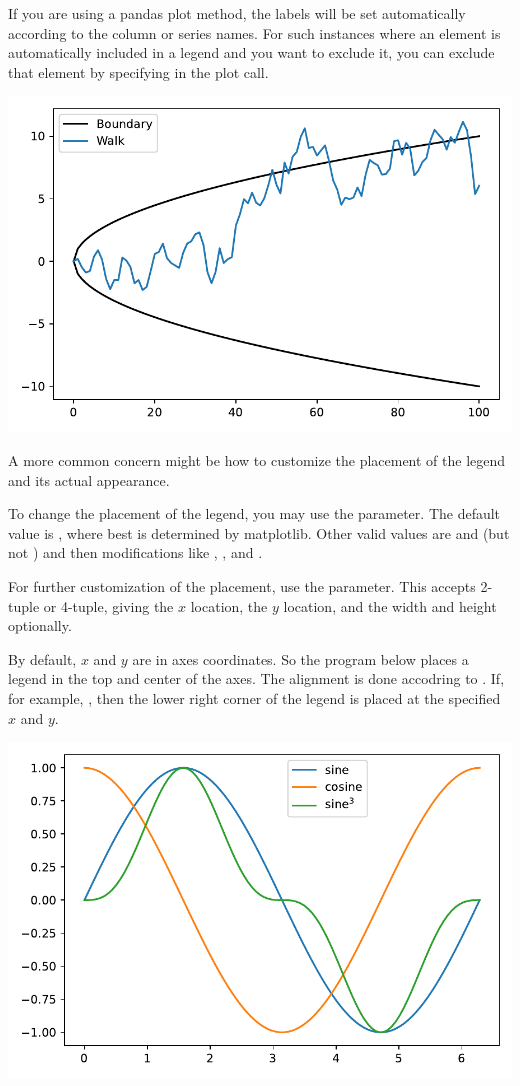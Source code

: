 If you are using a pandas plot method, the labels will be set automatically according to the column or series names. For such instances where an element is automatically included in a legend and you want to exclude it, you can exclude that element by specifying  in the plot call.




\begin{center}
    \includegraphics[width = .7\textwidth]{figures/proseplots/pd-legend.pdf}
\end{center}


A more common concern might be how to customize the placement of the legend and its actual appearance. 

To change the placement of the legend, you may use the  parameter. The default value is , where best is determined by matplotlib. Other valid values are  and  (but not ) and then modifications like , , and . 

For further customization of the placement, use the  parameter. This accepts 2-tuple or 4-tuple, giving the $x$ location, the $y$ location, and the width and height optionally.

By default, $x$ and $y$ are in axes coordinates. So the program below places a legend in the top and center of the axes. The alignment is done accodring to . If, for example, , then the lower right corner of the legend is placed at the specified $x$ and $y$. 


\begin{center}
    \includegraphics[width = .7\textwidth]{figures/proseplots/legend-bb.pdf}
\end{center}

